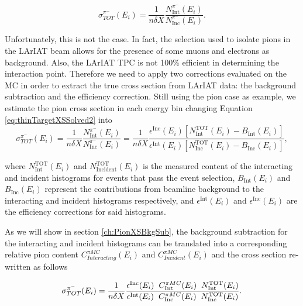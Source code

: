 \begin{equation}
 \sigma^{\pi^-}_{TOT}(E_{i})  = \frac{1}{n \delta X}\frac{N^{\pi^-}_{ \text{Int}} (E_{i})}{N^{\pi^-}_{ \text{Inc}}(E_{i})}.
\label{eq:thinTargetXSSolved2}
\end{equation}

Unfortunately, this is not the case. In fact, the selection used to isolate pions in the LArIAT beam allows for the presence of some muons and electrons as background. Also, the LArIAT TPC is not 100\% efficient in determining the interaction point. Therefore we need to apply two corrections evaluated on the MC in order to extract the true cross section from LArIAT data: the background subtraction and the efficiency correction. 
Still using the pion case as example, we estimate the pion cross section in each energy bin changing  Equation \ref{eq:thinTargetXSSolved2} into
\begin{equation}
 \sigma^{\pi^-}_{TOT}(E_{i})  =\frac{1}{n \delta X}\frac{N^{\pi^-}_{ \text{Int}} (E_{i})}{N^{\pi^-}_{ \text{Inc}}(E_{i})} = \frac{1}{n \delta X}\frac{ \epsilon^{\text{Inc}}(E_i) [ N^{ \text{TOT}}_{ \text{Int}} (E_{i}) - B_{ \text{Int}} (E_i)] }{   \epsilon^{\text{Int}}(E_i) [N^{ \text{TOT}}_{ \text{Inc}}(E_{i}) - B_{ \text{Inc}} (E_i)]},
\label{eq:True}
\end{equation}



 
where  $N^{\text{TOT}}_{\text{Int}} (E_{i})$ and $N^{\text{TOT}}_{\text{Incident}} (E_{i})$ is the measured content of the interacting and incident histograms for events that pass the event selection, $B_{\text{Int}} (E_i)$ and $B_{\text{Inc}} (E_i)$ represent the contributions from beamline background to the interacting and incident histograms respectively, and  $\epsilon^{\text{Int}}(E_i)$ and  $\epsilon^{\text{Inc}}(E_i)$ are the efficiency corrections for said histograms. 

As we will show in section \ref{ch:PionXSBkgSub}, the background subtraction for the interacting and incident histograms can be translated into a corresponding relative pion content $C^{\pi MC}_{Interacting} (E_{i})$ and $C^{\pi MC}_{Incident} (E_{i})$ and the cross section re-written as follows

\begin{equation}
      \sigma^{\pi^-}_{TOT}(E_{i})  = \frac{1}{n \delta X}\frac{ \epsilon^{\text{Inc}}(E_i)  \hspace{0.2cm} C^{\pi MC}_{\text{Int}} (E_{i}) \hspace{0.2cm} N^{\text{TOT}}_{\text{Int}} (E_{i}) }{   \epsilon^{\text{Int}}(E_i) \hspace{0.2cm} C^{\pi MC}_{\text{Inc}} (E_{i}) \hspace{0.2cm}  N^{\text{TOT}}_{\text{Inc}} (E_{i})}.
\label{eq:C}
\end{equation}



